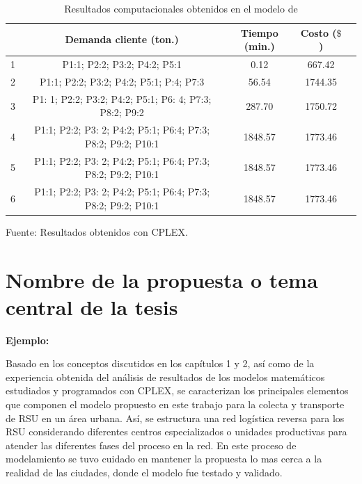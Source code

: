 \begin{table}[h!]
\begin{center}
\caption{\small{Resultados computacionales obtenidos en el modelo de \cite{Sterle}}}
\end{center}
\vskip -0.7cm
\begin{tabular}{|c|c|c|c|c|}
\hline 
\rowcolor{LightBlue2}{\small Escenarios} & {\small Demanda cliente (ton.)} & {\small Tiempo (min.)} & {\small Costo ($\$$)} \\ 
\hline 
{\small 1} & {\small P1:1; P2:2; P3:2; P4:2; P5:1} & {\small 0.12} & {\small 667.42} \\ 
\hline 
{\small 2} & {\small P1:1; P2:2; P3:2; P4:2; P5:1; P:4; P7:3} & {\small 56.54} & {\small 1744.35} \\ 
\hline 
{\small 3} & {\small P1: 1; P2:2; P3:2; P4:2; P5:1; P6: 4; P7:3; P8:2; P9:2} & {\small 287.70} & {\small 1750.72} \\ 
\hline 
{\small 4} & {\small P1:1; P2:2; P3: 2; P4:2; P5:1; P6:4; P7:3; P8:2; P9:2; P10:1} & {\small 1848.57} & {\small 1773.46} \\ 
\hline 
{\small 5} & {\small P1:1; P2:2; P3: 2; P4:2; P5:1; P6:4; P7:3; P8:2; P9:2; P10:1} & {\small 1848.57} & {\small 1773.46} \\ 
\hline 
{\small 6} & {\small P1:1; P2:2; P3: 2; P4:2; P5:1; P6:4; P7:3; P8:2; P9:2; P10:1} & {\small 1848.57} & {\small 1773.46} \\ 
\hline 
\end{tabular} 
\begin{center}
\vskip -0.2cm
{\small{Fuente: Resultados obtenidos con CPLEX.}}
\end{center}
\end{table}





\chapter{Nombre de la propuesta o tema central de la tesis}

{\bf Ejemplo:}\par

Basado en los conceptos discutidos en los capítulos 1 y 2, así como de la experiencia obtenida del análisis de resultados de los modelos matemáticos estudiados y programados con CPLEX, se caracterizan los principales elementos que componen el modelo propuesto en este trabajo para la colecta y transporte de RSU en un área urbana. Así, se estructura una red logística reversa para los RSU considerando diferentes centros especializados o unidades  productivas para atender las diferentes fases del proceso en la red. En este proceso de modelamiento se tuvo cuidado en mantener la propuesta lo mas cerca a la realidad de las ciudades, donde el modelo fue testado y validado.

